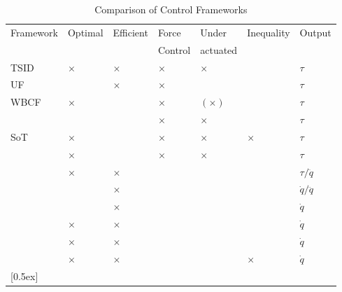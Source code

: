 \begin{table}[h] 
\caption{Comparison of Control Frameworks\cite{DelPrete2014c}}
\centering 
\begin{tabular}{|p{3.5cm} | p{1.2cm} p{1.2cm} p{1.2cm} p{1.2cm} p{1.4cm} p{1.1cm}|}
\hline 
	Framework		& Optimal & Efficient & Force& Under & Inequality & Output \\ 
 	& & & Control & actuated& &  \\ \rowcolor[gray]{.9}   
\hline 
	TSID\cite{DelPrete2014c}& $\times$ & $\times$ & $\times$ & $\times$ & & $\tau$ \\
	UF\cite{Peters2007}		&  & $\times$ & $\times$ &  & & $\tau$ \\  \rowcolor[gray]{.9}
	WBCF\cite{Sentis2005}	& $\times$ &  & $\times$ & $(\times)$ &  & $\tau$\\ 
	\cite{Mistry2011}		&  & & $\times$ & $\times$ & & $\tau$ \\ \rowcolor[gray]{.9}
	SoT\cite{Saab2011}		& $\times$ &  & $\times$ & $\times$ & $\times$& $\tau$ \\  
	\cite{DeLasa2009}		& $\times$ & &$\times$& $\times$ &  & $\tau$ \\  \rowcolor[gray]{.9}
	\cite{Jeong2009}		& $\times$ & $\times$ &  &  & & $\tau/\ddot{q}$ \\      
	\cite{nakamura1987task}		& & $\times$ &  &  & & $\dot{q}/\ddot{q}$ \\ \rowcolor[gray]{.9}
    	\cite{Chiaverini1997}		& & $\times$ &  &  & & $\dot{q}$ \\ 
	\cite{siciliano1991general}	& $\times$ & $\times$ &  &  & & $\dot{q}$ \\  \rowcolor[gray]{.9}

	\cite{Baerlocher1998}		& $\times$ & $\times$ &  &  & & $\dot{q}$ \\  
	\cite{Smits2008}		& $\times$ & $\times$ &  &  & $\times$& $\dot{q}$ \\   \rowcolor[gray]{.9}        
[0.5ex] \hline 
\end{tabular} 
\label{table:simu_params} %
\end{table}




